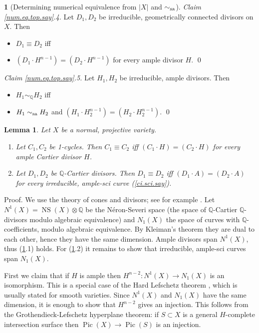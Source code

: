 \documentclass{amsart}
\newtheorem{lem}[thm]{Lemma}
\theoremstyle{definition}
\newtheorem{say}[thm]{}
\theoremstyle{remark}
\newcommand{\q}[0]{{\mathbb Q}}
\newcommand{\pic}[0]{\operatorname{Pic}}
\newcommand{\ns}[0]{\operatorname{NS}}
\newcommand{\simq}[0]{\sim_{\q}}
\newcommand{\simsa}[0]{\sim_{\rm sa}}
\begin{document}
\begin{say}[Determining numerical equivalence from $|X|$ and $\simsa$]
\medskip
{\it Claim \ref{num.eq.top.say}.4.}
Let  $D_1, D_2$ be irreducible, geometrically connected  divisors on $X$. 
Then  
\begin{itemize}
\item  $D_1\equiv D_2$ iff
\item  $(D_1\cdot H^{n-1}) = (D_2\cdot H^{n-1})$ for every ample  divisor $H$. \qed
\end{itemize}


\medskip
{\it Claim \ref{num.eq.top.say}.5.}
Let  $H_1, H_2$ be irreducible,  ample  divisors.
Then  
\begin{itemize}
\item  $H_1\simq H_2$ iff
\item  $H_1\simsa H_2$ and  $(H_1\cdot H_2^{n-1})=(H_2\cdot H_2^{n-1})$. 
\qed
\end{itemize}

 
\end{say}







\begin{lem}  \label{lin.eq.amp.lems}
Let $X$ be a normal, projective variety.
\begin{enumerate}
\item  Let $C_1, C_2$ be 1-cycles. Then  $C_1\equiv C_2$ iff   $(C_1\cdot H)=(C_2\cdot H)$ for every ample Cartier divisor $H$. 
\item Let $D_1, D_2$ be $\q$-Cartier divisors. Then  $D_1\equiv D_2$ iff   $(D_1\cdot A)=(D_2\cdot A)$ for every irreducible, ample-sci curve  (\ref{ci.sci.say}).  
\end{enumerate}
\end{lem}


Proof. We use  the theory of cones and divisors; see for example \cite[1.4.C]{laz-book}. 
Let $N^1(X)=\ns(X)\otimes\q$ be the N\'eron-Severi space (the space of $\q$-Cartier $\q$-divisors  modulo algebraic equivalence) and $N_1(X)$
the space of curves with $\q$-coefficients, modulo  algebraic equivalence.
By Kleiman's theorem \cite[1.4.23]{laz-book} they are dual to each other, hence they have the same dimension.  Ample divisors span $N^1(X)$, thus (\ref{lin.eq.amp.lems}.1) holds. For (\ref{lin.eq.amp.lems}.2) it remains to show that irreducible, ample-sci curves span $N_1(X)$.

First we claim that if $H$ is ample then
$H^{n-2}:N^1(X)\to N_1(X)$ is an isomorphism. This is a special case of the Hard Lefschetz theorem  \cite[3.1.39]{laz-book}, which is usually stated for
smooth varieties. Since $N^1(X)$ and $ N_1(X)$ have the same dimension, it is enough to show that $H^{n-2}$ gives an injection.  This follows from the
Grothendieck-Lefschetz hyperplane theorem: 
if $S\subset X$ is a general $H$-complete intersection surface then
$\pic(X)\to \pic(S)$ is an injection.
\end{document}

